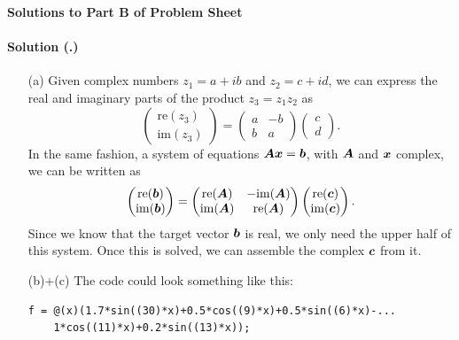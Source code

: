 \documentclass{article}
\newcounter{problemSheetNumber}
\newcounter{problems}
\renewcommand{\solution}[1]{\paragraph{Solution (\theproblemSheetNumber.\theproblems)}\addtocounter{problems}{1}\label{#1}}
\begin{document}
 
\begin{center}
{\Large {\bf Solutions to Part B of Problem Sheet \theproblemSheetNumber}}
\end{center}

\solution{pr:1} 
\begin{itemize}
 \item[(a)] Given complex numbers $z_1=a+ib$ and $z_2=c+id$, we can express the real and imaginary parts of the product $z_3=z_1z_2$ as
 \begin{equation*}
  \begin{pmatrix}
   \mathrm{re}(z_3)\\
   \mathrm{im}(z_3)
  \end{pmatrix}=
  \begin{pmatrix}
   a & -b\\
   b & a
  \end{pmatrix}
\begin{pmatrix}
 c \\ d
\end{pmatrix}.
 \end{equation*}
In the same fashion, a system of equations $\bm{A}\bm{x}=\bm{b}$, with $\bm{A}$ and $\bm{x}$ complex, we can be written as
\begin{equation*}
 \begin{pmatrix}
  \mathrm{re}(\bm{b})\\
  \mathrm{im}(\bm{b})
 \end{pmatrix}=
 \begin{pmatrix}
  \mathrm{re}(\bm{A}) & -\mathrm{im}(\bm{A})\\
  \mathrm{im}(\bm{A}) & \mathrm{re}(\bm{A})
 \end{pmatrix}
 \begin{pmatrix}
  \mathrm{re}(\bm{c})\\
  \mathrm{im}(\bm{c})
 \end{pmatrix}.
\end{equation*}
Since we know that the target vector $\bm{b}$ is real, we only need the upper half of this system. Once this is solved, we can assemble the complex $\bm{c}$ from it.

\item[(b)+(c)] The code could look something like this:

{\small
\begin{lstlisting}[frame=single]
% Define signal on interval [0,2\pi]
f = @(x)(1.7*sin((30)*x)+0.5*cos((9)*x)+0.5*sin((6)*x)-...
    1*cos((11)*x)+0.2*sin((13)*x));


\end{lstlisting}}
\end{itemize}
\end{document}
